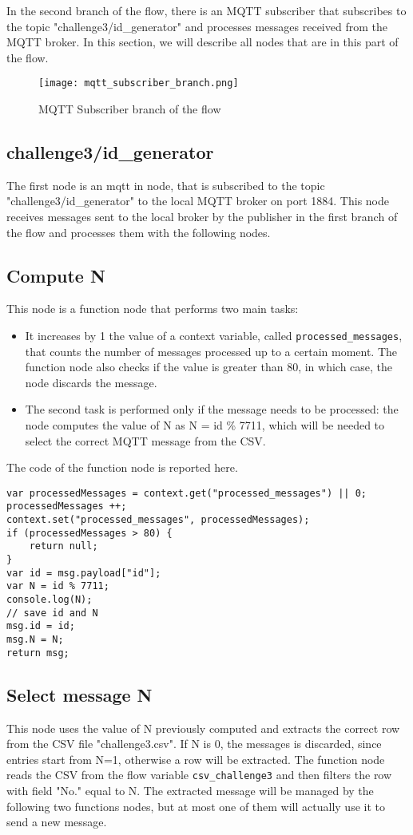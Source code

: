 In the second branch of the flow, there is an MQTT subscriber that subscribes to the topic "challenge3/id\_generator" and processes messages received from the MQTT broker. In this section, we will describe all nodes that are in this part of the flow.

\begin{figure}[H]
    \centering
    \texttt{[image: mqtt\_subscriber\_branch.png]}
    \caption{MQTT Subscriber branch of the flow}
\end{figure}

\subsection{challenge3/id\_generator}
The first node is an mqtt in node, that is subscribed to the topic "challenge3/id\_generator" to the local MQTT broker on port 1884. This node receives messages sent to the local broker by the publisher in the first branch of the flow and processes them with the following nodes.

\subsection{Compute N}
This node is a function node that performs two main tasks:
\begin{itemize}
\item It increases by 1 the value of a context variable, called \verb|processed_messages|, that counts the number of messages processed up to a certain moment. The function node also checks if the value is greater than 80, in which case, the node discards the message.
\item The second task is performed only if the message needs to be processed: the node computes the value of N as N = id \% 7711, which will be needed to select the correct MQTT message from the CSV.
\end{itemize}

The code of the function node is reported here.
\begin{verbatim}
var processedMessages = context.get("processed_messages") || 0;
processedMessages ++;
context.set("processed_messages", processedMessages);
if (processedMessages > 80) {
    return null;
}
var id = msg.payload["id"];
var N = id % 7711;
console.log(N);
// save id and N
msg.id = id;
msg.N = N;
return msg;
\end{verbatim}

\subsection{Select message N}
This node uses the value of N previously computed and extracts the correct row from the CSV file "challenge3.csv". If N is 0, the messages is discarded, since entries start from N=1, otherwise a row will be extracted. The function node reads the CSV from the flow variable \verb|csv_challenge3| and then filters the row with field "No." equal to N. The extracted message will be managed by the following two functions nodes, but at most one of them will actually use it to send a new message.

